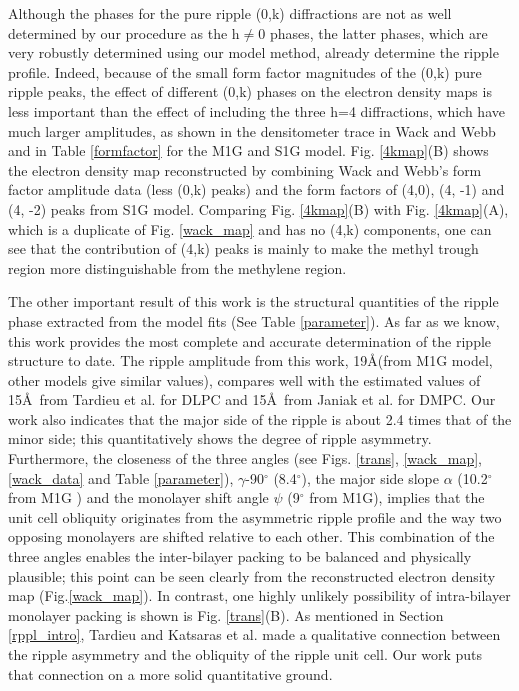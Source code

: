 Although the phases for the pure ripple (0,k) diffractions
are not as well determined by our procedure as the h$\neq$0 phases,
the latter phases, which are very robustly determined using
our model method, already determine the ripple profile.  
Indeed, because of the small form factor magnitudes of the (0,k) pure
ripple peaks, the effect of different (0,k) phases on the electron density
maps is less important than the effect of including the three h=4 
diffractions, which have much larger amplitudes, as shown in the
densitometer trace in Wack and Webb \cite{Wac89a} and in Table \ref{formfactor} 
for the M1G and S1G model. Fig. \ref{4kmap}(B) shows the electron density
map reconstructed by combining Wack and Webb's form factor amplitude
data (less (0,k) peaks) and the form factors of (4,0), (4, -1) and
(4, -2) peaks from S1G model. Comparing Fig. \ref{4kmap}(B) with
Fig. \ref{4kmap}(A), which is a duplicate of Fig. \ref{wack_map} and
has no (4,k) components, one can see that the contribution of (4,k) peaks 
is mainly to make the methyl trough region more distinguishable from
the methylene region.

The other important result of this work is the structural quantities
of the ripple phase extracted from the model fits (See Table \ref{parameter}). 
As far as we know, this work provides the most complete and accurate 
determination of the ripple structure to date. The
ripple amplitude from this work, 19\AA (from M1G model, other models give
similar values), compares well with the estimated values of 15\AA\ from 
Tardieu et al. \cite{Tar73} for DLPC and 15\AA\ from 
Janiak et al. \cite{JanSS79} for DMPC. Our work also indicates that the 
major side of the ripple is about 2.4 times that of the minor side; this
quantitatively shows the degree of ripple asymmetry. Furthermore, the closeness
of the three angles (see Figs. \ref{trans}, \ref{wack_map}, \ref{wack_data} 
and Table \ref{parameter}), $\gamma$-90$^{\circ}$ (8.4$^{\circ}$), the major 
side slope $\alpha$ (10.2$^{\circ}$ from M1G ) and the 
monolayer shift angle $\psi$ (9$^{\circ}$ from M1G), implies that the unit 
cell obliquity originates from the asymmetric ripple profile and the way 
two opposing monolayers are shifted relative to each other. This combination
of the three angles enables the inter-bilayer packing to be balanced and 
physically plausible; this point can be seen clearly from the reconstructed 
electron density map (Fig.\ref{wack_map}). In contrast, one highly unlikely 
possibility of intra-bilayer monolayer packing is shown
is Fig. \ref{trans}(B). As mentioned in Section \ref{rppl_intro}, 
Tardieu \cite{Tar72} and Katsaras et al. \cite{Kat95} made
a qualitative connection between the ripple asymmetry and the obliquity 
of the ripple unit cell. Our work puts that connection on a more solid 
quantitative ground.


